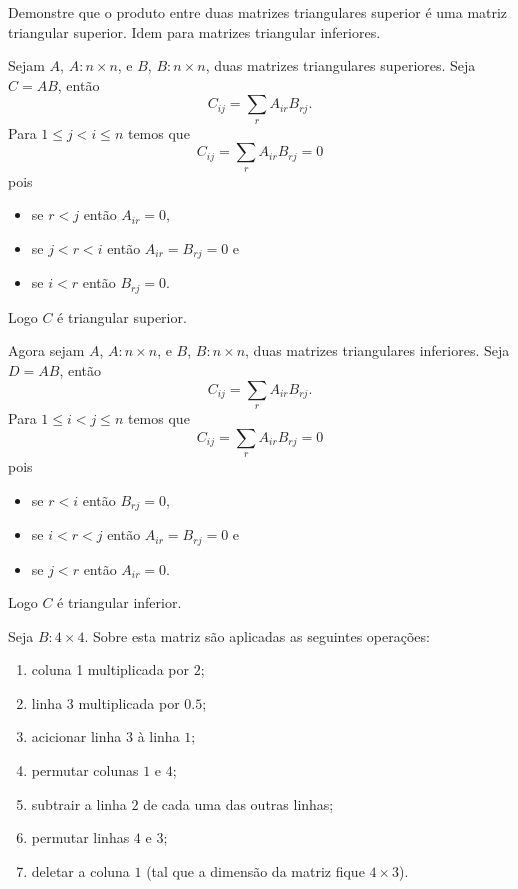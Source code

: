 \documentclass[a4paper,12pt, leqno, answers]{exam}
\begin{document}
\begin{questions}
    \question Demonstre que o produto entre duas matrizes triangulares superior \'{e} uma matriz triangular superior. Idem para matrizes triangular inferiores.
    \begin{solution}
        Sejam $A$, $A: n \times n$, e $B$, $B: n \times n$, duas matrizes triangulares superiores. Seja $C = A B$, ent\~{a}o
        \[
        C_{ij} = \sum_r A_{ir} B_{rj}.
        \]
        Para $1 \leq j < i \leq n$ temos que
        \[
        C_{ij} = \sum_r A_{ir} B_{rj} = 0
        \]
        pois
        \begin{itemize}
            \item se $r < j$ ent\~{a}o $A_{ir} = 0$,
            \item se $j < r < i$ ent\~{a}o $A_{ir} = B_{rj} = 0$ e
            \item se $i < r$ ent\~{a}o $B_{rj} = 0$.
        \end{itemize}
        Logo $C$ \'{e} triangular superior.

        Agora sejam $A$, $A: n \times n$, e $B$, $B: n \times n$, duas matrizes triangulares inferiores. Seja $D = A B$, ent\~{a}o
        \[
        C_{ij} = \sum_r A_{ir} B_{rj}.
        \]
        Para $1 \leq i < j \leq n$ temos que
        \[
        C_{ij} = \sum_r A_{ir} B_{rj} = 0
        \]
        pois
        \begin{itemize}
            \item se $r < i$ ent\~{a}o $B_{rj} = 0$,
            \item se $i < r < j$ ent\~{a}o $A_{ir} = B_{rj} = 0$ e
            \item se $j < r$ ent\~{a}o $A_{ir} = 0$.
        \end{itemize}
        Logo $C$ \'{e} triangular inferior.
    \end{solution}

     Seja $B : 4 \times 4$. Sobre esta matriz s\~{a}o aplicadas as seguintes opera\c{c}\~{o}es:
    \begin{enumerate}
        \item coluna 1 multiplicada por $2$;
        \item linha 3 multiplicada por $0.5$;
        \item acicionar linha $3$ \`{a} linha $1$;
        \item permutar colunas $1$ e $4$;
        \item subtrair a linha $2$ de cada uma das outras linhas;
        \item permutar linhas $4$ e $3$;
        \item deletar a coluna $1$ (tal que a dimens\~{a}o da matriz fique $4 \times 3$).
    \end{enumerate}
    \begin{parts}

\end{parts}
\end{questions}
\end{document}
